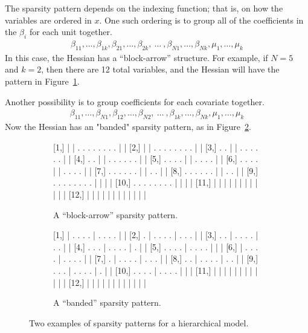 \documentclass[jss]{jss}\usepackage[]{graphicx}\usepackage[]{color}
\begin{document}
The sparsity pattern depends on the indexing function; that is, on how the variables are
ordered in $x$. One such ordering is to group all of the
coefficients in the $\beta_i$ for each unit together.
\begin{align}
\beta_{11},\dotsc,\beta_{1k},\beta_{21},\dotsc,\beta_{2k},~\dotsc~,\beta_{N1},\dotsc,\beta_{Nk},\mu_1,\dotsc,\mu_k
\end{align}
In this case, the Hessian has a ``block-arrow'' structure.  For example,
if $N=5$ and $k=2$, then there are 12 total
variables, and the Hessian will have the pattern in Figure~\ref{fig:blockarrow}.

Another possibility is to group coefficients for each covariate
together.
\begin{align}
\beta_{11},\dotsc,\beta_{N1},\beta_{12},\dotsc,\beta_{N2},~\dotsc~,\beta_{1k},\dotsc,\beta_{Nk},\mu_1,\dotsc,\mu_k
\end{align}
Now the Hessian has an "banded" sparsity pattern, as in Figure~\ref{fig:banded}.
\begin{figure}[tbp]
  \begin{subfigure}[b]{.5\textwidth}
\begin{Schunk}
\begin{Soutput}
                             
 [1,] | | . . . . . . . . | |
 [2,] | | . . . . . . . . | |
 [3,] . . | | . . . . . . | |
 [4,] . . | | . . . . . . | |
 [5,] . . . . | | . . . . | |
 [6,] . . . . | | . . . . | |
 [7,] . . . . . . | | . . | |
 [8,] . . . . . . | | . . | |
 [9,] . . . . . . . . | | | |
[10,] . . . . . . . . | | | |
[11,] | | | | | | | | | | | |
[12,] | | | | | | | | | | | |
\end{Soutput}
\end{Schunk}
\caption{A ``block-arrow'' sparsity pattern.}\label{fig:blockarrow}
\end{subfigure}
\begin{subfigure}[b]{.5\textwidth}
\begin{Schunk}
\begin{Soutput}
                             
 [1,] | . . . . | . . . . | |
 [2,] . | . . . . | . . . | |
 [3,] . . | . . . . | . . | |
 [4,] . . . | . . . . | . | |
 [5,] . . . . | . . . . | | |
 [6,] | . . . . | . . . . | |
 [7,] . | . . . . | . . . | |
 [8,] . . | . . . . | . . | |
 [9,] . . . | . . . . | . | |
[10,] . . . . | . . . . | | |
[11,] | | | | | | | | | | | |
[12,] | | | | | | | | | | | |
\end{Soutput}
\end{Schunk}
\caption{A ``banded'' sparsity pattern.}\label{fig:banded}
\end{subfigure}
\caption{Two examples of sparsity patterns for a hierarchical model.}\label{fig:patterns}
\end{figure}
\end{document}
